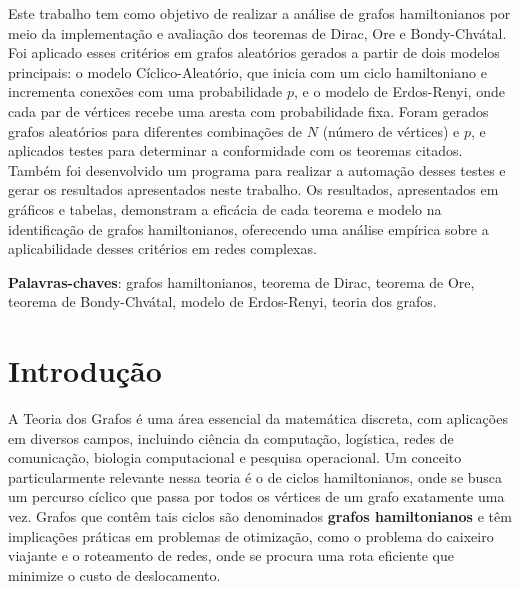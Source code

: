\documentclass[12pt, openright, oneside, a4paper, chapter=TITLE, section=TITLE, subsection=TITLE, subsubsection=TITLE, brazil]{abntex2}
\begin{document}
\setlength{\absparsep}{18pt} %
\begin{resumo}
Este trabalho tem como objetivo de realizar a análise de grafos hamiltonianos por meio da implementação e avaliação dos teoremas de Dirac, Ore e Bondy-Chvátal. Foi aplicado esses critérios em grafos aleatórios gerados a partir de dois modelos principais: o modelo Cíclico-Aleatório, que inicia com um ciclo hamiltoniano e incrementa conexões com uma probabilidade $p$, e o modelo de Erdos-Renyi, onde cada par de vértices recebe uma aresta com probabilidade fixa. Foram gerados grafos aleatórios para diferentes combinações de $N$ (número de vértices) e $p$, e aplicados testes para determinar a conformidade com os teoremas citados. Também foi desenvolvido um programa para realizar a automação desses testes e gerar os resultados apresentados neste trabalho. Os resultados, apresentados em gráficos e tabelas, demonstram a eficácia de cada teorema e modelo na identificação de grafos hamiltonianos, oferecendo uma análise empírica sobre a aplicabilidade desses critérios em redes complexas.

 \textbf{Palavras-chaves}: grafos hamiltonianos, teorema de Dirac, teorema de Ore, teorema de Bondy-Chvátal, modelo de Erdos-Renyi, teoria dos grafos.
\end{resumo}


\tableofcontents*


\chapter[Introdução]{Introdução}

\hspace{1.25cm}A Teoria dos Grafos é uma área essencial da matemática discreta, com aplicações em diversos campos, incluindo ciência da computação, logística, redes de comunicação, biologia computacional e pesquisa operacional. Um conceito particularmente relevante nessa teoria é o de ciclos hamiltonianos, onde se busca um percurso cíclico que passa por todos os vértices de um grafo exatamente uma vez. Grafos que contêm tais ciclos são denominados \textbf{grafos hamiltonianos} e têm implicações práticas em problemas de otimização, como o problema do caixeiro viajante e o roteamento de redes, onde se procura uma rota eficiente que minimize o custo de deslocamento.
\end{document}
